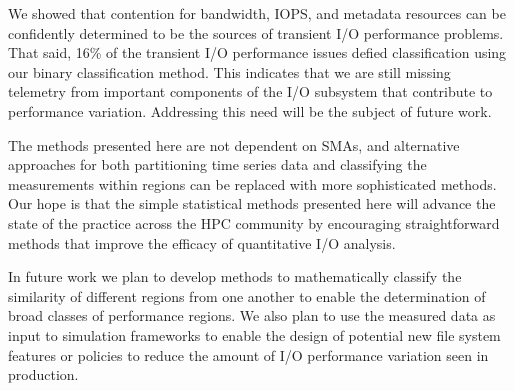 We showed that contention for bandwidth, IOPS, and metadata resources can be confidently determined to be the sources of transient I/O performance  problems.
That said, 16\% of the transient I/O performance issues defied classification using our binary classification method.
This indicates that we are still missing telemetry from important components of the I/O subsystem that contribute to performance variation. Addressing this need will be the subject of future work. 

The methods presented here are not dependent on SMAs, and alternative
approaches for both partitioning time series data and classifying the
measurements within regions can be replaced with more sophisticated methods.
Our hope is that the simple statistical methods presented here will advance
the state of the practice across the HPC community by encouraging
straightforward methods that improve the efficacy of quantitative I/O analysis.

In future work we plan to develop methods to mathematically classify the similarity of different regions from one another to enable the determination of broad classes of performance regions. We also plan to use the measured data as input to simulation frameworks to enable the design of potential new file system features or policies to reduce the  amount of I/O performance variation seen in production. 



\endinput

